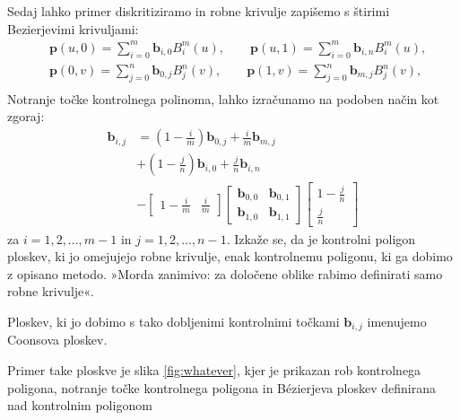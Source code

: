 \documentclass[a4paper,12pt]{article}
\begin{document}
Sedaj lahko primer diskritiziramo in robne krivulje zapišemo s štirimi 
Bezierjevimi krivuljami:
\begin{align*}
    &\mathbf{p}(u,0) =\sum_{i=0}^m \mathbf{b}_{i,0} B_i^m(u), \qquad
    \mathbf{p}(u,1) =\sum_{i=0}^m \mathbf{b}_{i,n} B_i^m(u),  \\
    &\mathbf{p}(0,v) =\sum_{j=0}^n \mathbf{b}_{0,j} B_j^n(v), \qquad
    \mathbf{p}(1,v) =\sum_{j=0}^n \mathbf{b}_{m,j} B_j^n(v),  \\
 \end{align*}
Notranje točke kontrolnega polinoma, lahko izračunamo na podoben način kot zgoraj: 
\begin{align*}
   \mathbf{b}_{i,j} &= \left(1 - \frac{i}{m}\right)\mathbf{b}_{0,j} +\frac{i}{m}\mathbf{b}_{m,j}\\
    &+ \left(1 - \frac{j}{n}\right)\mathbf{b}_{i,0} +\frac{j}{n}\mathbf{b}_{i,n}\ \\
   &- 
   \begin{bmatrix} 
      1 - \frac{i}{m} & \frac{i}{m}
   \end{bmatrix}
   \begin{bmatrix} 
      \mathbf{b}_{0,0} & \mathbf{b}_{0,1}\\
      \mathbf{b}_{1,0} & \mathbf{b}_{1,1}
   \end{bmatrix}
   \begin{bmatrix}
      1 - \frac{j}{n}\\
      \frac{j}{n}
   \end{bmatrix}
\end{align*}
za $i = 1,2,\dots,m-1$ in $j = 1,2,\dots,n-1$. Izkaže se, da je kontrolni poligon ploskev, 
ki jo omejujejo robne krivulje, enak kontrolnemu poligonu, ki ga dobimo z opisano metodo. 
»Morda zanimivo: za določene oblike rabimo definirati samo robne krivulje«.

Ploskev, ki jo dobimo s tako dobljenimi kontrolnimi točkami $\mathbf{b}_{i,j}$
imenujemo Coonsova ploskev.

Primer take ploskve je slika \ref{fig:whatever}, kjer je prikazan 
rob kontrolnega poligona, notranje točke kontrolnega poligona in 
Bézierjeva ploskev definirana nad kontrolnim poligonom
\end{document}

